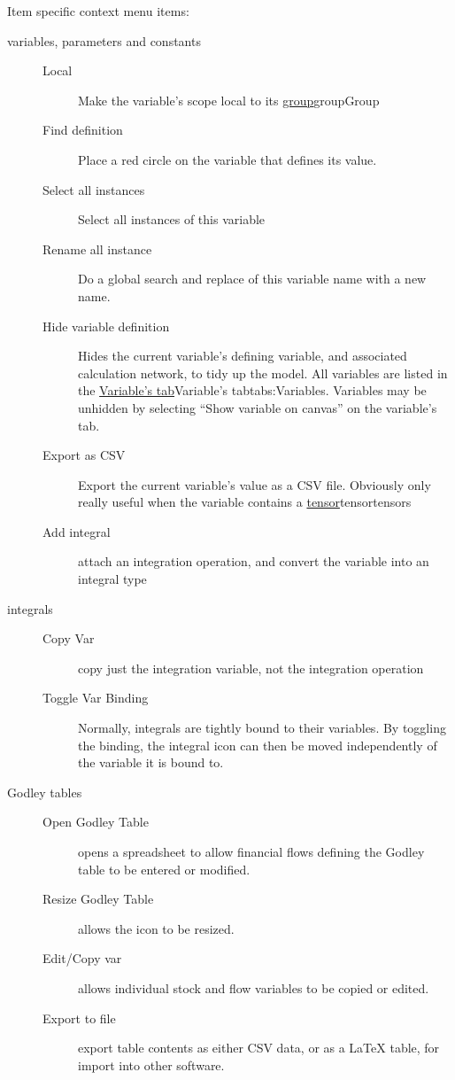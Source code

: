 Item specific context menu items:
\begin{description}
\item[variables, parameters and constants]\mbox{}
  \begin{description}
  \item[Local] Make the variable's scope local to its
    \hyperref[ref]{group}{group}{}{Group}
  \item[Find definition] Place a red circle on the variable that
    defines its value.
  \item[Select all instances] Select all instances of this variable
  \item[Rename all instance] Do a global search and replace of this
    variable name with a new name.
  \item[Hide variable definition] Hides the current variable's defining
    variable, and associated calculation network, to tidy up the
    model. All variables are listed in the \hyperref[ref]{Variable's
      tab}{Variable's tab}{}{tabs:Variables}. Variables may be
    unhidden by selecting ``Show variable on canvas'' on the variable's tab.
  \item[Export as CSV] Export the current variable's value as a CSV
    file. Obviously only really useful when the variable contains a
    \hyperref[ref]{tensor}{tensor}{}{tensors}
  \item[Add integral] attach an integration operation, and convert the
    variable into an integral type
  \end{description}
\item[integrals]\mbox{}
  \begin{description}
  \item[Copy Var] copy just the integration variable, not the
    integration operation
  \item[Toggle Var Binding] Normally, integrals are tightly bound to
    their variables. By toggling the binding, the integral icon can
    then be moved independently of the variable it is bound to.
  \end{description}
\item[Godley tables]\mbox{}
  \begin{description}
  \item[Open Godley Table] opens a spreadsheet to allow financial
    flows defining the Godley table to be entered or modified.
  \item[Resize Godley Table] allows the icon to be resized.
  \item[Edit/Copy var] allows individual stock and flow variables to
    be copied or edited.
  \item[Export to file] export table contents as either CSV data, or
    as a LaTeX table, for import into other software.
  \end{description}
        

\end{description}
